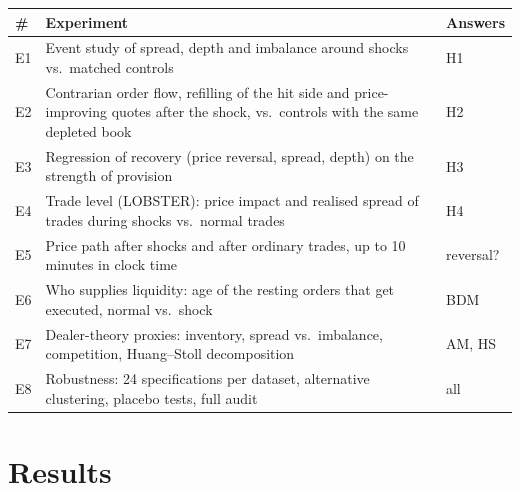 \documentclass[11pt,a4paper]{article}
\begin{document}
\begin{center}
\begin{tabularx}{\linewidth}{@{}l X l@{}}
\toprule
\# & \textbf{Experiment} & \textbf{Answers} \\
\midrule
E1 & Event study of spread, depth and imbalance around shocks vs.\ matched controls & H1 \\
E2 & Contrarian order flow, refilling of the hit side and price-improving quotes after the shock, vs.\ controls with the same depleted book & H2 \\
E3 & Regression of recovery (price reversal, spread, depth) on the strength of provision & H3 \\
E4 & Trade level (LOBSTER): price impact and realised spread of trades during shocks vs.\ normal trades & H4 \\
E5 & Price path after shocks and after ordinary trades, up to 10 minutes in clock time & reversal? \\
E6 & Who supplies liquidity: age of the resting orders that get executed, normal vs.\ shock & BDM \\
E7 & Dealer-theory proxies: inventory, spread vs.\ imbalance, competition, Huang--Stoll decomposition & AM, HS \\
E8 & Robustness: 24 specifications per dataset, alternative clustering, placebo tests, full audit & all \\
\bottomrule
\end{tabularx}
\end{center}

\section{Results}
\label{sec:results}
\end{document}

